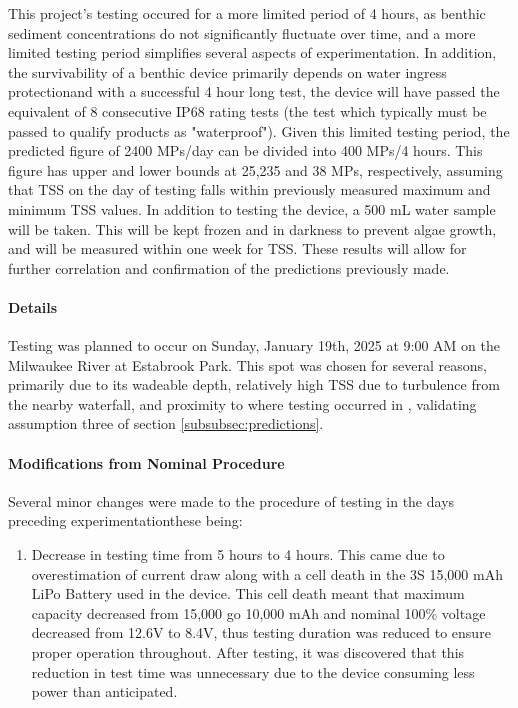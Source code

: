 \documentclass[fleqn,10pt]{SelfArx} %
\begin{document}
	This project's testing occured for a more limited period of 4 hours, as benthic sediment concentrations do not significantly fluctuate over time, and a more limited testing period simplifies several aspects of experimentation. In addition, the survivability of a benthic device primarily depends on water ingress protection\textemdash and with a successful 4 hour long test, the device will have passed the equivalent of 8 consecutive IP68 rating tests (the test which typically must be passed to qualify products as "waterproof"). Given this limited testing period, the predicted figure of 2400 MPs/day can be divided into 400 MPs/4 hours. This figure has upper and lower bounds at 25,235 and 38 MPs, respectively, assuming that TSS on the day of testing falls within previously measured maximum and minimum TSS values.
	\linebreak
	In addition to testing the device, a 500 mL water sample will be taken. This will be kept frozen and in darkness to prevent algae growth, and will be measured within one week for TSS. These results will allow for further correlation and confirmation of the predictions previously made.
	
	\paragraph*{Details}
	Testing was planned to occur on Sunday, January 19th, 2025 at 9:00 AM on the Milwaukee River at Estabrook Park. This spot was chosen for several reasons, primarily due to its wadeable depth, relatively high TSS due to turbulence from the nearby waterfall, and proximity to where testing occurred in \cite{LenakerEtAlvertdist}, validating assumption three of section \ref{subsubsec:predictions}. 
	\paragraph*{Modifications from Nominal Procedure}
	\label{sec:mods}
	Several minor changes were made to the procedure of testing in the days preceding experimentation\textemdash these being:
	\begin{enumerate}
		\item Decrease in testing time from 5 hours to 4 hours. This came due to overestimation of current draw along with a cell death in the 3S 15,000 mAh LiPo Battery used in the device. This cell death meant that maximum capacity decreased from 15,000 go 10,000 mAh and nominal 100\% voltage decreased from 12.6V to 8.4V, thus testing duration was reduced to ensure proper operation throughout. After testing, it was discovered that this reduction in test time was unnecessary due to the device consuming less power than anticipated. 
	\end{enumerate}
\end{document}
